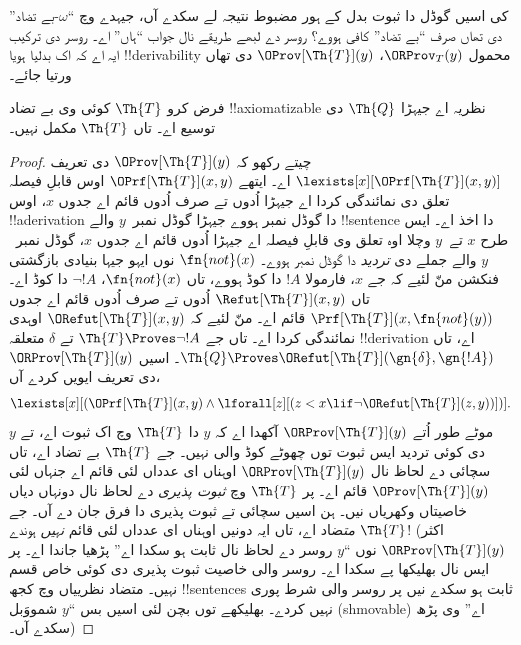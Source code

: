\documentclass[../../../include/open-logic-section]{subfiles}
\begin{document}


کی اسیں گوڈل دا ثبوت بدل کے ہور مضبوط نتیجہ لے سکدے آں،
جیہدے وچ “$\omega$-بے تضاد” دی تھاں صرف “بے تضاد” کافی
ہووے؟ روسر دے لبھے طریقے نال جواب “ہاں” اے۔ روسر دی ترکیب
ایہ اے کہ اک بدلیا ہویا !!{derivability} محمول
$\ORProv_T(y)$، $\OProv[\Th{T}](y)$ دی تھاں ورتیا جائے۔

\begin{thm}
فرض کرو $\Th{T}$ کوئی وی بے تضاد !!{axiomatizable} نظریہ
اے جیہڑا $\Th{Q}$ دی توسیع اے۔ تاں $\Th{T}$ مکمل نہیں۔
\end{thm}

\begin{proof}
چیتے رکھو کہ $\OProv[\Th{T}](y)$ دی تعریف
$\lexists[x][\OPrf[\Th{T}](x,
  y)]$ اے۔ ایتھے $\OPrf[\Th{T}](x, y)$ اوس قابلِ فیصلہ
تعلق دی نمائندگی کردا اے جیہڑا اُدوں تے صرف اُدوں قائم اے
جدوں $x$، اوس !!a{derivation} دا گوڈل نمبر ہووے جیہڑا گوڈل
نمبر~$y$ والے !!{sentence} دا اخذ اے۔ ایس طرح $x$ تے~$y$
وچلا اوہ تعلق وی قابلِ فیصلہ اے جیہڑا اُدوں قائم اے جدوں $x$،
گوڈل نمبر~$y$ والے جملے دی \emph{تردید} دا گوڈل نمبر ہووے۔
$\fn{not}(x)$ نوں ایہو جیہا بنیادی بازگشتی فنکشن منّ لئیے کہ
جے $x$، فارمولا $!A$ دا کوڈ ہووے، تاں $\fn{not}(x)$،
$\lnot
!A$ دا کوڈ اے۔ تاں $\Refut[\Th{T}](x, y)$ اُدوں تے صرف
اُدوں قائم اے جدوں $\Prf[\Th{T}](x, \fn{not}(y))$ قائم اے۔
منّ لئیے کہ $\ORefut[\Th{T}](x, y)$ اوہدی نمائندگی کردا اے۔
تاں جے $\Th{T} \Proves \lnot !A$ تے $\delta$ متعلقہ
!!{derivation} اے، تاں $\Th{Q} \Proves
\ORefut[\Th{T}](\gn{\delta}, \gn{!A})$۔ اسیں
$\ORProv[\Th{T}](y)$ دی تعریف ایویں کردے آں،
\[
\lexists[x][(\OPrf[\Th{T}](x,y) \land \lforall[z][(z < x \lif \lnot
  \ORefut[\Th{T}](z,y))])].
\]
موٹے طور اُتے $\ORProv[\Th{T}](y)$ آکھدا اے کہ $y$ دا
$\Th{T}$ وچ اک ثبوت اے، تے $y$ دی کوئی تردید ایس ثبوت
توں چھوٹے کوڈ والی نہیں۔ جے $\Th{T}$ بے تضاد اے، تاں سچائی
دے لحاظ نال $\ORProv[\Th{T}](y)$ اوہناں ای عدداں لئی قائم اے
جنہاں لئی $\OProv[\Th{T}](y)$ قائم اے۔ پر $\Th{T}$ وچ
\emph{ثبوت پذیری} دے لحاظ نال دونہاں دیاں خاصیتاں وکھریاں نیں۔
ہن اسیں سچائی تے ثبوت پذیری دا فرق جان دے آں۔ جے $\Th{T}$
\emph{مت}ضاد اے، تاں ایہ دونیں اوہناں ای عدداں لئی
قائم \emph{نہیں} ہوندے!{} (اکثر $\ORProv[\Th{T}](y)$
نوں “$y$ روسر دے لحاظ نال ثابت ہو سکدا اے” پڑھیا جاندا اے۔
پر ایس نال بھلیکھا پے سکدا اے۔ روسر والی خاصیت ثبوت پذیری
دی کوئی خاص قسم نہیں۔ متضاد نظرییاں وچ کجھ !!{sentence}s
ثابت ہو سکدے نیں پر روسر والی شرط پوری نہیں کردے۔ بھلیکھے
توں بچن لئی اسیں بس “$y$ شمووَبل (shmovable) اے” وی پڑھ
سکدے آں۔)


\end{proof}
\end{document}
